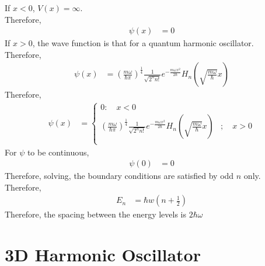 \documentclass[titlepage, fleqn, a4paper, 12pt, twoside]{article}
\theoremstyle{definition}
\theoremstyle{theorem}
\let\Oldsection\section
\renewcommand{\section}{\FloatBarrier\Oldsection}
\begin{document}
\begin{solution}
	If $x < 0$, $V(x) = \infty$.\\
	Therefore,
	\begin{align*}
		\psi(x) &= 0
	\end{align*}
	If $x > 0$, the wave function is that for a quantum harmonic oscillator.\\
	Therefore,
	\begin{align*}
		\psi(x) &= \left( \frac{m \omega}{\hbar \pi} \right)^{\frac{1}{4}} \frac{1}{\sqrt{2^n n!}} e^{-\frac{m \omega x^2}{2 \hbar}} H_n \left( \sqrt{\frac{m \omega}{\hbar}} x \right)
	\end{align*}
	Therefore,
	\begin{align*}
		\psi(x) &=
			\begin{cases}
				0 :\quad x < 0\\
				\left( \frac{m \omega}{\hbar \pi} \right)^{\frac{1}{4}} \frac{1}{\sqrt{2^n n!}} e^{-\frac{m \omega x^2}{2 \hbar}} H_n \left( \sqrt{\frac{m \omega}{\hbar}} x \right) &;\quad x > 0\\
			\end{cases}
	\end{align*}
	For $\psi$ to be continuous,
	\begin{align*}
		\psi(0) &= 0
	\end{align*}
	Therefore, solving, the boundary conditions are satisfied by odd $n$ only.\\
	Therefore,
	\begin{align*}
		E_n &= \hbar w \left( n + \frac{1}{2} \right)
	\end{align*}
	Therefore, the spacing between the energy levels is $2 \hbar \omega$
\end{solution}

\section{3D Harmonic Oscillator}
\end{document}
